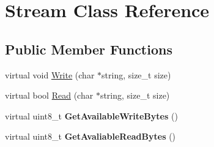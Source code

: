 \hypertarget{class_stream}{\section{Stream Class Reference}
\label{class_stream}
}
\subsection*{Public Member Functions}
\begin{DoxyCompactItemize}
\item 
virtual void \hyperlink{class_stream_a3b8a725d2698fe067f65dc70d495fe3d}{Write} (char $\ast$string, size\-\_\-t size)
\item 
virtual bool \hyperlink{class_stream_a3bae4fba73b6e4e9fa256bae866887c8}{Read} (char $\ast$string, size\-\_\-t size)
\item 
\hypertarget{class_stream_ade48d0be8cb9a4fbddea0ae68af689c7}{virtual uint8\-\_\-t {\bfseries Get\-Available\-Write\-Bytes} ()}\label{class_stream_ade48d0be8cb9a4fbddea0ae68af689c7}

\item 
\hypertarget{class_stream_a0766c270e9cc5b77d4fe34d4a5ac8790}{virtual uint8\-\_\-t {\bfseries Get\-Avaliable\-Read\-Bytes} ()}\label{class_stream_a0766c270e9cc5b77d4fe34d4a5ac8790}

\end{DoxyCompactItemize}


